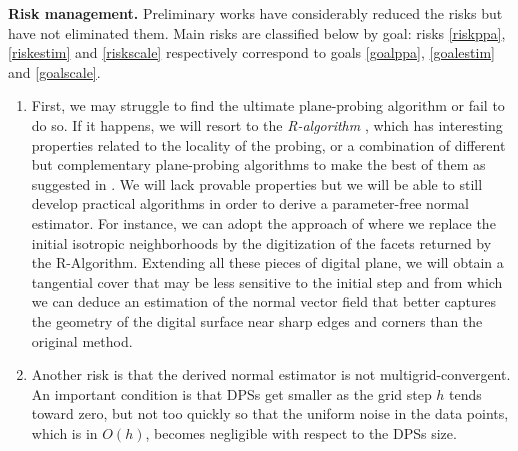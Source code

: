 \noindent\textbf{Risk management.}
Preliminary works have considerably reduced the risks but have not eliminated them.
Main risks are classified below by goal: risks \ref{riskppa}, \ref{riskestim} and \ref{riskscale}
respectively correspond to goals \ref{goalppa}, \ref{goalestim} and \ref{goalscale}. 
\begin{enumerate}[label=(R\arabic*)]
  \item %
First, we may struggle to find the ultimate plane-probing algorithm or fail to do so.
If it happens, we will resort to the \emph{R-algorithm} \cite{LPRJMIV2017}, which
has interesting properties related to the locality of the probing, or a combination
of different but complementary plane-probing algorithms to make the best of them
as suggested in \cite{LPRJMIV2017}. We will lack provable properties but we will be able to still
develop practical algorithms in order to derive a parameter-free normal estimator.
For instance, we can adopt the approach of \citeauthor*{Charrier2011} \cite{Charrier2011}
where we replace the initial isotropic neighborhoods by the digitization of the facets
returned by the R-Algorithm. Extending all these pieces of digital plane, we will obtain a
tangential cover that may be less sensitive to the initial step and from which we can
deduce an estimation of the normal vector field that better captures the geometry of
the digital surface near sharp edges and corners than the original method. \label{riskppa} 
\item %
Another risk is that the derived normal estimator is not multigrid-convergent.
An important condition is that DPSs get smaller as the grid step $h$ tends toward zero,
but not too quickly so that the uniform noise in the data points,
which is in $O(h)$, becomes negligible with respect to the DPSs size. 

\end{enumerate}
